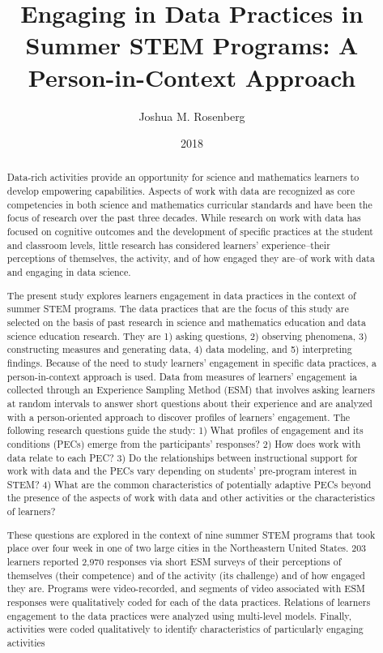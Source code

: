 \documentclass[]{msu-thesis}
\title{Engaging in Data Practices in Summer STEM Programs: A Person-in-Context Approach
}
\author{Joshua M. Rosenberg}
\date{2018}
\theoremstyle{definition}
\theoremstyle{definition}
\theoremstyle{definition}
\theoremstyle{remark}
\begin{document}

\maketitlepage
\begin{abstract}
Data-rich activities provide an opportunity for science and mathematics learners to develop empowering capabilities. Aspects of work with data are recognized as core competencies in both science and mathematics curricular standards and have been the focus of research over the past three decades. While research on work with data has focused on cognitive outcomes and the development of specific practices at the student and classroom levels, little research has considered learners' experience--their perceptions of themselves, the activity, and of how engaged they are--of work with data and engaging in data science.

The present study explores learners engagement in data practices in the context of summer STEM programs. The data practices that are the focus of this study are selected on the basis of past research in science and mathematics education and data science education research. They are 1) asking questions, 2) observing phenomena, 3) constructing measures and generating data, 4) data modeling, and 5) interpreting findings. Because of the need to study learners' engagement in specific data practices, a person-in-context approach is used. Data from measures of learners' engagement ia collected through an Experience Sampling Method (ESM) that involves asking learners at random intervals to answer short questions about their experience and are analyzed with a person-oriented approach to discover profiles of learners' engagement. The following research questions guide the study: 1) What profiles of engagement and its conditions (PECs) emerge from the participants’ responses? 2) How does work with data relate to each PEC? 3) Do the relationships between instructional support for work with data and the PECs vary depending on students’ pre-program interest in STEM? 4) What are the common characteristics of potentially adaptive PECs beyond the presence of the aspects of work with data and other activities or the characteristics of learners?

These questions are explored in the context of nine summer STEM programs that took place over four week in one of two large cities in the Northeastern United States. 203 learners reported 2,970 responses via short ESM surveys of their perceptions of themselves (their competence) and of the activity (its challenge) and of how engaged they are. Programs were video-recorded, and segments of video associated with ESM responses were qualitatively coded for each of the data practices. Relations of learners engagement to the data practices were analyzed using multi-level models. Finally, activities were coded qualitatively to identify characteristics of particularly engaging activities


\end{abstract}
\end{document}
